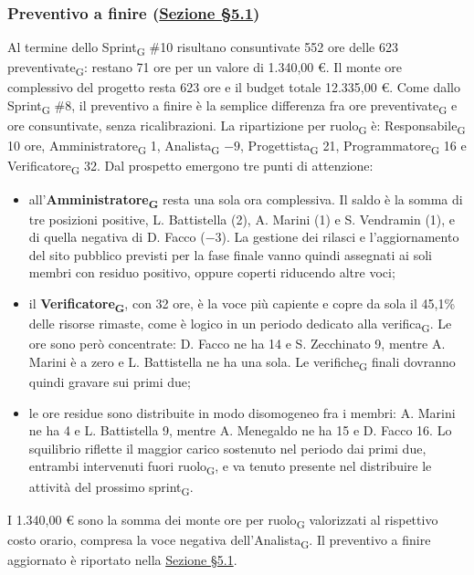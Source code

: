 ﻿\documentclass[a4paper, 10pt, colorlinks=true, linkcolor=black, urlcolor=blue, citecolor=blue, hidelinks]{article}
\begin{document}
\subsubsection{Preventivo a finire (\hyperref[tab:preventivo-finire]{Sezione \S5.1})}
Al termine dello Sprint\textsubscript{G} \#10 risultano consuntivate 552 ore delle 623 preventivate\textsubscript{G}: restano 71 ore per un valore di 1.340,00 €. Il monte ore complessivo del progetto resta 623 ore e il budget totale 12.335,00 €.
Come dallo Sprint\textsubscript{G} \#8, il preventivo a finire è la semplice differenza fra ore preventivate\textsubscript{G} e ore consuntivate, senza ricalibrazioni. La ripartizione per ruolo\textsubscript{G} è: Responsabile\textsubscript{G} 10 ore, Amministratore\textsubscript{G} 1, Analista\textsubscript{G} $-9$, Progettista\textsubscript{G} 21, Programmatore\textsubscript{G} 16 e Verificatore\textsubscript{G} 32.
Dal prospetto emergono tre punti di attenzione:
\begin{itemize}
    \item all'\textbf{Amministratore\textsubscript{G}} resta una sola ora complessiva. Il saldo è la somma di tre posizioni positive, L. Battistella (2), A. Marini (1) e S. Vendramin (1), e di quella negativa di D. Facco ($-3$). La gestione dei rilasci e l'aggiornamento del sito pubblico previsti per la fase finale vanno quindi assegnati ai soli membri con residuo positivo, oppure coperti riducendo altre voci;
    \item il \textbf{Verificatore\textsubscript{G}}, con 32 ore, è la voce più capiente e copre da sola il 45,1\% delle risorse rimaste, come è logico in un periodo dedicato alla verifica\textsubscript{G}. Le ore sono però concentrate: D. Facco ne ha 14 e S. Zecchinato 9, mentre A. Marini è a zero e L. Battistella ne ha una sola. Le verifiche\textsubscript{G} finali dovranno quindi gravare sui primi due;
    \item le ore residue sono distribuite in modo disomogeneo fra i membri: A. Marini ne ha 4 e L. Battistella 9, mentre A. Menegaldo ne ha 15 e D. Facco 16. Lo squilibrio riflette il maggior carico sostenuto nel periodo dai primi due, entrambi intervenuti fuori ruolo\textsubscript{G}, e va tenuto presente nel distribuire le attività del prossimo sprint\textsubscript{G}.
\end{itemize}
I 1.340,00 € sono la somma dei monte ore per ruolo\textsubscript{G} valorizzati al rispettivo costo orario, compresa la voce negativa dell'Analista\textsubscript{G}. Il preventivo a finire aggiornato è riportato nella \hyperref[tab:preventivo-finire]{Sezione \S5.1}.
\end{document}
